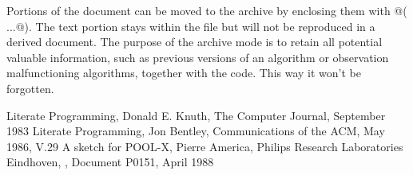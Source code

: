 \documentclass{article}
\begin{document}
Portions of the \Mx document can be moved to the archive by
enclosing them with @( ...@). The text portion stays within the 
\Mx file but will not be reproduced in a derived document.
The purpose of the archive mode is to retain all potential valuable
information, such as previous versions of an algorithm or 
observation malfunctioning algorithms, together with the code.
This way it won't be forgotten.
\begin{thebibliography}{Knuth xx}
{ Literate Programming, Donald E. Knuth, The Computer Journal, September 1983}
{ Literate Programming, Jon Bentley, Communications of the ACM, May 1986, V.29}
{ A sketch for POOL-X, Pierre America, Philips Research Laboratories Eindhoven,
, Document P0151, April 1988 }
\end{thebibliography}
\end{document}
